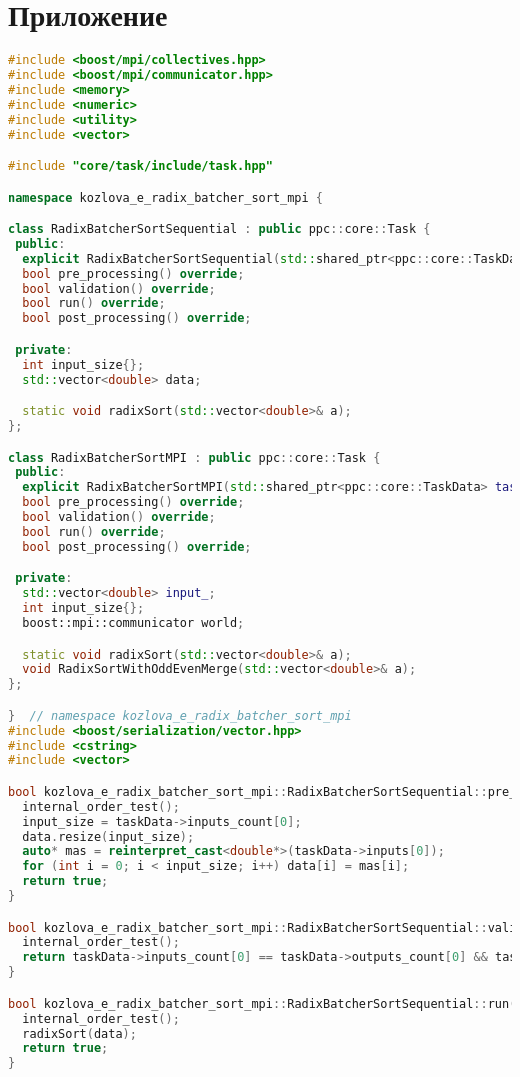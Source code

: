\documentclass[a4paper,12pt]{article}
\begin{document}
\newpage
\section*{\centering Приложение}
\begin{lstlisting}[language=C++,caption={Код программы}]
#include <boost/mpi/collectives.hpp>
#include <boost/mpi/communicator.hpp>
#include <memory>
#include <numeric>
#include <utility>
#include <vector>

#include "core/task/include/task.hpp"

namespace kozlova_e_radix_batcher_sort_mpi {

class RadixBatcherSortSequential : public ppc::core::Task {
 public:
  explicit RadixBatcherSortSequential(std::shared_ptr<ppc::core::TaskData> taskData_) : Task(std::move(taskData_)) {}
  bool pre_processing() override;
  bool validation() override;
  bool run() override;
  bool post_processing() override;

 private:
  int input_size{};
  std::vector<double> data;

  static void radixSort(std::vector<double>& a);
};

class RadixBatcherSortMPI : public ppc::core::Task {
 public:
  explicit RadixBatcherSortMPI(std::shared_ptr<ppc::core::TaskData> taskData_) : Task(std::move(taskData_)) {}
  bool pre_processing() override;
  bool validation() override;
  bool run() override;
  bool post_processing() override;

 private:
  std::vector<double> input_;
  int input_size{};
  boost::mpi::communicator world;

  static void radixSort(std::vector<double>& a);
  void RadixSortWithOddEvenMerge(std::vector<double>& a);
};

}  // namespace kozlova_e_radix_batcher_sort_mpi
#include <boost/serialization/vector.hpp>
#include <cstring>
#include <vector>

bool kozlova_e_radix_batcher_sort_mpi::RadixBatcherSortSequential::pre_processing() {
  internal_order_test();
  input_size = taskData->inputs_count[0];
  data.resize(input_size);
  auto* mas = reinterpret_cast<double*>(taskData->inputs[0]);
  for (int i = 0; i < input_size; i++) data[i] = mas[i];
  return true;
}

bool kozlova_e_radix_batcher_sort_mpi::RadixBatcherSortSequential::validation() {
  internal_order_test();
  return taskData->inputs_count[0] == taskData->outputs_count[0] && taskData->inputs_count[0] >= 0;
}

bool kozlova_e_radix_batcher_sort_mpi::RadixBatcherSortSequential::run() {
  internal_order_test();
  radixSort(data);
  return true;
}


\end{lstlisting}
\end{document}
